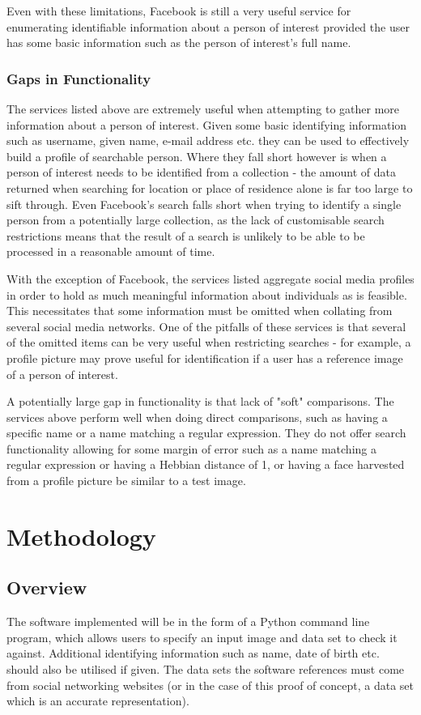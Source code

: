 \documentclass[12pt]{article}
\begin{document}
Even with these limitations, Facebook is still a very useful service for enumerating identifiable information about a person of interest provided the user has some basic information such as the person of interest's full name.

\subsubsection{Gaps in Functionality}
The services listed above are extremely useful when attempting to gather more information about a person of interest. Given some basic identifying information such as username, given name, e-mail address etc. they can be used to effectively build a profile of searchable person. Where they fall short however is when a person of interest needs to be identified from a collection - the amount of data returned when searching for location or place of residence alone is far too large to sift through. Even Facebook's search falls short when trying to identify a single person from a potentially large collection, as the lack of customisable search restrictions means that the result of a search is unlikely to be able to be processed in a reasonable amount of time.

With the exception of Facebook, the services listed aggregate social media profiles in order to hold as much meaningful information about individuals as is feasible. This necessitates that some information must be omitted when collating from several social media networks. One of the pitfalls of these services is that several of the omitted items can be very useful when restricting searches - for example, a profile picture may prove useful for identification if a user has a reference image of a person of interest.

A potentially large gap in functionality is that lack of "soft" comparisons. The services above perform well when doing direct comparisons, such as having a specific name or a name matching a regular expression. They do not offer search functionality allowing for some margin of error such as a name matching a regular expression or having a Hebbian distance of 1, or having a face harvested from a profile picture be similar to a test image.

\newpage
\section{Methodology}
\subsection{Overview}
The software implemented will be in the form of a Python command line program, which allows users to specify an input image and data set to check it against. Additional identifying information such as name, date of birth etc. should also be utilised if given. The data sets the software references must come from social networking websites (or in the case of this proof of concept, a data set which is an accurate representation).
\end{document}

